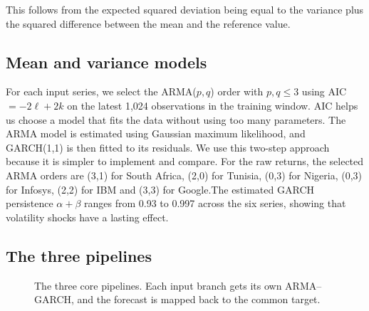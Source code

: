 \documentclass{article}
\begin{document}
This follows from the expected squared deviation being equal to the variance plus the squared difference between the mean and the reference value.

\subsection{Mean and variance models}

For each input series, we select the ARMA($p,q$) order with $p,q\le3$ using AIC $=-2\ell+2k$ on the latest 1,024 observations in the training window. AIC helps us choose a model that fits the data without using too many parameters. The ARMA model is estimated using Gaussian maximum likelihood, and GARCH(1,1) is then fitted to its residuals. We use this two-step approach because it is simpler to implement and compare. For the raw returns, the selected ARMA orders are (3,1) for South Africa, (2,0) for Tunisia, (0,3) for Nigeria, (0,3) for Infosys, (2,2) for IBM and (3,3) for Google.The estimated GARCH persistence $\alpha+\beta$  ranges from 0.93 to 0.997 across the six series, showing that volatility shocks have a lasting effect.

\subsection{The three pipelines}

\begin{figure}[H]
\centering
{}
\caption{The three core pipelines. Each input branch gets its own ARMA--GARCH, and the forecast is mapped back to the common target.}
\label{fig:pipe}
\end{figure}
\end{document}
